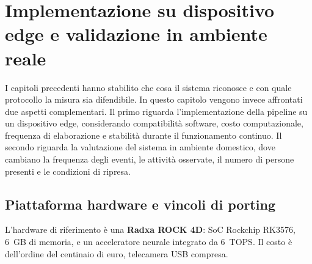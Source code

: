 %
%
%

\chapter{Implementazione su dispositivo edge e validazione in ambiente reale}
\label{cap:campo}
\label{cap:edge}

I capitoli precedenti hanno stabilito che cosa il sistema riconosce e con quale protocollo la misura sia difendibile. In questo capitolo vengono invece affrontati due aspetti complementari. Il primo riguarda l'implementazione della pipeline su un dispositivo edge, considerando compatibilità software, costo computazionale, frequenza di elaborazione e stabilità durante il funzionamento continuo. Il secondo riguarda la valutazione del sistema in ambiente domestico, dove cambiano la frequenza degli eventi, le attività osservate, il numero di persone presenti e le condizioni di ripresa.

\section{Piattaforma hardware e vincoli di porting}

L'hardware di riferimento è una \textbf{Radxa ROCK 4D}: SoC Rockchip RK3576, 6~GB di memoria, e un acceleratore neurale integrato da 6~TOPS. Il costo è dell'ordine del centinaio di euro, telecamera USB compresa.

